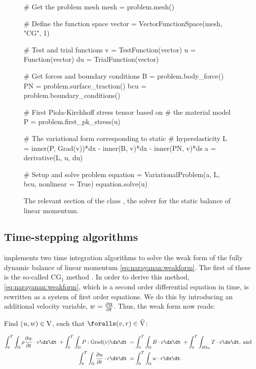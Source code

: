 \begin{figure}[ht]
\begin{python}
# Get the problem mesh
mesh = problem.mesh()

# Define the function space
vector = VectorFunctionSpace(mesh, "CG", 1)

# Test and trial functions
v = TestFunction(vector)
u = Function(vector)
du = TrialFunction(vector)

# Get forces and boundary conditions
B = problem.body_force()
PN = problem.surface_traction()
bcu = problem.boundary_conditions()

# First Piola-Kirchhoff stress tensor based on
# the material model
P = problem.first_pk_stress(u)

# The variational form corresponding to static
# hyperelasticity
L = inner(P, Grad(v))*dx - inner(B, v)*dx - inner(PN, v)*ds
a = derivative(L, u, du)

# Setup and solve problem
equation = VariationalProblem(a, L, bcu,
                              nonlinear = True)
equation.solve(u)
\end{python}
\caption{The relevant section of the class , the solver for the static balance of
  linear momentum.}
\label{code:narayanan:staticmomentumsolver}
\end{figure}

\subsection{Time-stepping algorithms}

\twist{} implements two time integration algorithms to solve the weak
form of the fully dynamic balance of linear momentum
\eqref{eq:narayanan:weakform}. The first of these is the
so-called CG$_{1}$ method \citep{ErikssonEstepHansboEtAl1996}. In order
to derive this method, \eqref{eq:narayanan:weakform}, which is
a second order differential equation in time, is rewritten as a system
of first order equations. We do this by introducing an additional
velocity variable, $\mbox{$ w$} = \frac{\partial \mbox{$ u$}}{\partial t}$. Thus, the
weak form now reads:

\noindent Find ($\mbox{$ u$}, \mbox{$ w$}) \in \mathrm{V}$, such that $\foralls (\bv,
\br) \in \hat{\mathrm{V}}$:

\begin{equation}
\begin{split}
  \int_{0}^{T} \int_{\Omega} \rho \frac{\partial \bw}{\partial t}
\cdot \bv \dx \dt\; + \int_{0}^{T} \int_{\Omega}
\bP:\mathrm{Grad}(\bv) \dx \dt\; &= \int_{0}^{T} \int_{\Omega} \bB
\cdot \bv \dx \dt\; + \int_{0}^{T} \int_{\partial\Omega_{\mathrm{N}}}
\bT \cdot \bv \ds \dt, \; \mathrm{and}\\ \int_{0}^{T} \int_{\Omega}
\frac{\partial \bu}{\partial t} \cdot \br \dx \dt\; &= \int_{0}^{T}
\int_{\Omega} \bw \cdot \br \dx \dt.
\end{split}
\label{eq:narayanan:cg1weakform}
\end{equation}

